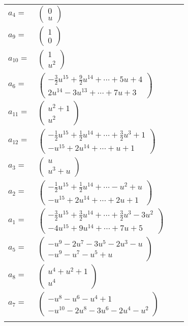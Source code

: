\documentclass[1p]{elsarticle_modified}
\theoremstyle{definition}
\begin{document}
\begin{tabular}{m{7pt} m{180pt} m{7pt} m{180pt} }
\flushright $a_{4}=$&$\begin{pmatrix}0\\u\end{pmatrix}$ \\
\flushright $a_{9}=$&$\begin{pmatrix}1\\0\end{pmatrix}$ \\
\flushright $a_{10}=$&$\begin{pmatrix}1\\u^2\end{pmatrix}$ \\
\flushright $a_{6}=$&$\begin{pmatrix}-\frac{3}{2} u^{15}+\frac{9}{2} u^{14}+\cdots+5 u+4\\2 u^{14}-3 u^{13}+\cdots+7 u+3\end{pmatrix}$ \\
\flushright $a_{11}=$&$\begin{pmatrix}u^2+1\\u^2\end{pmatrix}$ \\
\flushright $a_{12}=$&$\begin{pmatrix}-\frac{1}{2} u^{15}+\frac{1}{2} u^{14}+\cdots+\frac{3}{2} u^3+1\\- u^{15}+2 u^{14}+\cdots+u+1\end{pmatrix}$ \\
\flushright $a_{3}=$&$\begin{pmatrix}u\\u^3+u\end{pmatrix}$ \\
\flushright $a_{2}=$&$\begin{pmatrix}-\frac{1}{2} u^{15}+\frac{1}{2} u^{14}+\cdots- u^2+u\\- u^{15}+2 u^{14}+\cdots+2 u+1\end{pmatrix}$ \\
\flushright $a_{1}=$&$\begin{pmatrix}-\frac{3}{2} u^{15}+\frac{3}{2} u^{14}+\cdots+\frac{3}{2} u^3-3 u^2\\-4 u^{15}+9 u^{14}+\cdots+7 u+5\end{pmatrix}$ \\
\flushright $a_{5}=$&$\begin{pmatrix}- u^9-2 u^7-3 u^5-2 u^3- u\\- u^9- u^7- u^5+u\end{pmatrix}$ \\
\flushright $a_{8}=$&$\begin{pmatrix}u^4+u^2+1\\u^4\end{pmatrix}$ \\
\flushright $a_{7}=$&$\begin{pmatrix}- u^8- u^6- u^4+1\\- u^{10}-2 u^8-3 u^6-2 u^4- u^2\end{pmatrix}$\\&\end{tabular}
\end{document}
